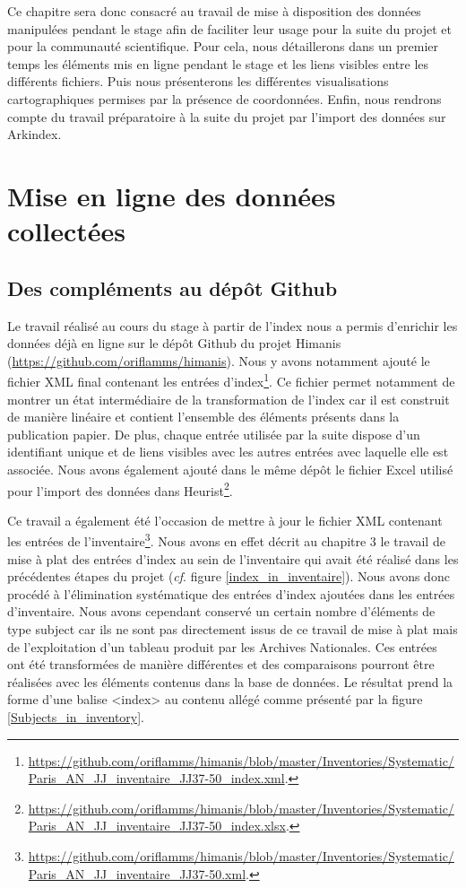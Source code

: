 \documentclass[a4paper,12pt,twoside]{book}
\begin{document}
	Ce chapitre sera donc consacré au travail de mise à disposition des données manipulées pendant le stage afin de faciliter leur usage pour la suite du projet et pour la communauté scientifique. Pour cela, nous détaillerons dans un premier temps les éléments mis en ligne pendant le stage et les liens visibles entre les différents fichiers. Puis nous présenterons les différentes visualisations cartographiques permises par la présence de coordonnées. Enfin, nous rendrons compte du travail préparatoire à la suite du projet par l'import des données sur Arkindex.
	
	\section{Mise en ligne des données collectées}
	
	\subsection{Des compléments au dépôt Github}
	
	Le travail réalisé au cours du stage à partir de l'index nous a permis d'enrichir les données déjà en ligne sur le dépôt Github du projet Himanis (\url{https://github.com/oriflamms/himanis}). Nous y avons notamment ajouté le fichier XML final contenant les entrées d'index\footnote{\url{https://github.com/oriflamms/himanis/blob/master/Inventories/Systematic/Paris_AN_JJ_inventaire_JJ37-50_index.xml}.}. Ce fichier permet notamment de montrer un état intermédiaire de la transformation de l'index car il est construit de manière linéaire et contient l'ensemble des éléments présents dans la publication papier. De plus, chaque entrée utilisée par la suite dispose d'un identifiant unique et de liens visibles avec les autres entrées avec laquelle elle est associée. Nous avons également ajouté dans le même dépôt le fichier Excel utilisé pour l'import des données dans Heurist\footnote{\url{https://github.com/oriflamms/himanis/blob/master/Inventories/Systematic/Paris_AN_JJ_inventaire_JJ37-50_index.xlsx}.}.
	
	Ce travail a également été l'occasion de mettre à jour le fichier XML contenant les entrées de l'inventaire\footnote{\url{https://github.com/oriflamms/himanis/blob/master/Inventories/Systematic/Paris_AN_JJ_inventaire_JJ37-50.xml}.}. Nous avons en effet décrit au chapitre 3 le travail de mise à plat des entrées d'index au sein de l'inventaire qui avait été réalisé dans les précédentes étapes du projet (\textit{cf}. figure \ref{index_in_inventaire}). Nous avons donc procédé à l'élimination systématique des entrées d'index ajoutées dans les entrées d'inventaire. Nous avons cependant conservé un certain nombre d'éléments de type \og subject \fg{} car ils ne sont pas directement issus de ce travail de mise à plat mais de l'exploitation d'un tableau produit par les Archives Nationales. Ces entrées ont été transformées de manière différentes et des comparaisons pourront être réalisées avec les éléments contenus dans la base de données. Le résultat prend la forme d'une balise <index> au contenu allégé comme présenté par la figure \ref{Subjects_in_inventory}.
	
\end{document}
